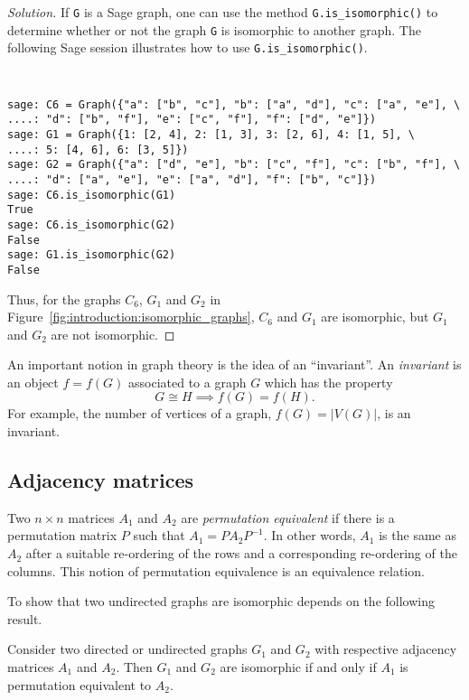 \begin{proof}[Solution]
If \verb!G! is a Sage graph, one can use the method
\verb!G.is_isomorphic()! to determine whether or not the graph
\verb!G! is isomorphic to another graph. The following Sage session
illustrates how to use \verb!G.is_isomorphic()!.
%
\begin{center}
\fontsize{9pt}{9pt}
\selectfont
\tt
\begin{lstlisting}
sage: C6 = Graph({"a": ["b", "c"], "b": ["a", "d"], "c": ["a", "e"], \
....: "d": ["b", "f"], "e": ["c", "f"], "f": ["d", "e"]})
sage: G1 = Graph({1: [2, 4], 2: [1, 3], 3: [2, 6], 4: [1, 5], \
....: 5: [4, 6], 6: [3, 5]})
sage: G2 = Graph({"a": ["d", "e"], "b": ["c", "f"], "c": ["b", "f"], \
....: "d": ["a", "e"], "e": ["a", "d"], "f": ["b", "c"]})
sage: C6.is_isomorphic(G1)
True
sage: C6.is_isomorphic(G2)
False
sage: G1.is_isomorphic(G2)
False
\end{lstlisting}
\end{center}
%
Thus, for the graphs $C_6$, $G_1$ and $G_2$ in
Figure~\ref{fig:introduction:isomorphic_graphs}, $C_6$ and $G_1$ are
isomorphic, but $G_1$ and $G_2$ are not isomorphic.
\end{proof}

An important notion in graph theory is the idea of an ``invariant''.
An \emph{invariant} is an object $f = f(G)$ associated to a
graph $G$ which has the property
\[
G \cong H \implies f(G) = f(H).
\]
For example, the number of vertices of a graph, $f(G) = |V(G)|$, is an
invariant.
\index{graph invariant}



\subsection{Adjacency matrices}

Two $n \times n$ matrices $A_1$ and $A_2$ are
\emph{permutation equivalent} if there is a permutation matrix $P$
such that $A_1 = P A_2 P^{-1}$. In other words, $A_1$ is the same as
$A_2$ after a suitable re-ordering of the rows and a corresponding
re-ordering of the columns.
\index{permutation equivalent}
This notion of permutation equivalence is an equivalence relation.

To show that two undirected graphs are isomorphic depends on the
following result.

\begin{theorem}
\label{thm:introduction:adjoint_matrix_invariant}
Consider two directed or undirected graphs $G_1$ and $G_2$ with
respective adjacency matrices $A_1$ and $A_2$. Then $G_1$ and $G_2$
are isomorphic if and only if $A_1$ is permutation equivalent to
$A_2$.
\end{theorem}

